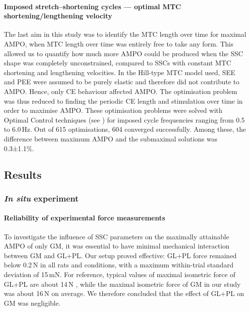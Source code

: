 \documentclass[
  10pt,
  letterpaper,
]{article}
\begin{document}
\paragraph{Imposed stretch--shortening cycles --- optimal MTC
shortening/lengthening
velocity}\label{imposed-stretchshortening-cycles-optimal-mtc-shorteninglengthening-velocity}

The last aim in this study was to identify the MTC length over time for
maximal AMPO, when MTC length over time was entirely free to take any
form. This allowed us to quantify how much more AMPO could be produced
when the SSC shape was completely unconstrained, compared to SSCs with
constant MTC shortening and lengthening velocities. In the Hill-type MTC
model used, SEE and PEE were assumed to be purely elastic
\citep[e.g.][]{anderson_dynamic_1999, van_soest_contribution_1993} and
therefore did not contribute to AMPO. Hence, only CE behaviour affected
AMPO. The optimisation problem was thus reduced to finding the periodic
CE length and stimulation over time in order to maximise AMPO. These
optimisation problems were solved with Optimal Control techniques (see
{}) for imposed cycle frequencies ranging from 0.5 to
6.0\,Hz. Out of 615 optimisations, 604 converged successfully. Among
these, the difference between maximum AMPO and the submaximal solutions
was 0.3±1.1\%.

\subsection{Results}\label{results}

\subsubsection{\texorpdfstring{\emph{In situ}
experiment}{In situ experiment}}\label{in-situ-experiment-1}

\paragraph{Reliability of experimental force
measurements}\label{reliability-of-experimental-force-measurements}

To investigate the influence of SSC parameters on the maximally
attainable AMPO of only GM, it was essential to have minimal mechanical
interaction between GM and GL+PL. Our setup proved effective: GL+PL
force remained below 0.2\,N in all rats and conditions, with a maximum
within-trial standard deviation of 15\,mN. For reference, typical values
of maximal isometric force of GL+PL are about 14\,N
\citep{bernabei_significant_2015}, while the maximal isometric force of
GM in our study was about 16\,N on average. We therefore concluded that
the effect of GL+PL on GM was negligible.
\end{document}
